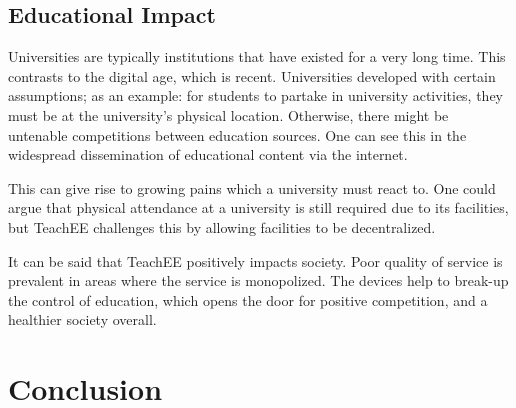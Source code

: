 \documentclass[letterpaper,12pt]{article}
\begin{document}
\subsection{Educational Impact}

Universities are typically institutions that have existed for a very long time.
This contrasts to the digital age, which is recent. Universities developed with
certain assumptions; as an example: for students to partake in university
activities, they must be at the university's physical location. Otherwise, there
might be untenable competitions between education sources. One
can see this in the widespread dissemination of educational content via the
internet.

This can give rise to growing pains which a university must react to. One could
argue that physical attendance at a university is still required due to its
facilities, but TeachEE challenges this by allowing facilities to be
decentralized.

It can be said that TeachEE positively impacts society. Poor quality of
service is prevalent in areas where the service is monopolized. The devices help
to break-up the control of education, which opens the door for positive
competition, and a healthier society overall.


\section{Conclusion}
\newpage


\newpage
\end{document}
